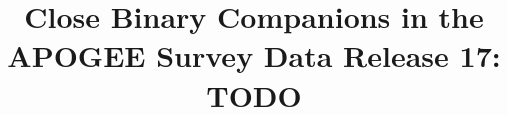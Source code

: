 


\documentclass[modern]{aastex63}

\usepackage{microtype}  %
\usepackage{amsmath}
\usepackage{amsfonts}
\usepackage{amssymb}
\usepackage{booktabs}
\usepackage{graphicx}

\usepackage{enumitem}

\renewcommand{\twocolumngrid}{\onecolumngrid} %
\setlength{\parindent}{1.1\baselineskip}
\addtolength{\topmargin}{-0.2in}
\addtolength{\textheight}{0.4in}
\sloppy\sloppypar\raggedbottom\frenchspacing

\newcommand{\changes}[1]{{\color{violet}#1}}

\newcommand{\nsources}{\ensuremath{232\,495}}


\newcommand{\visit}{visit}
\newcommand{\thisdr}{\dr{17}}

\graphicspath{{figures/}}





\title{Close Binary Companions in the APOGEE Survey Data Release 17: \\
       TODO}

